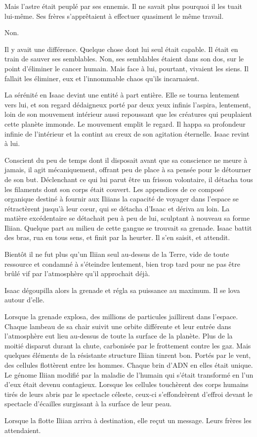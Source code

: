 \documentclass[12pt]{book}
\begin{document}
Mais l'astre était peuplé par ses ennemis. Il ne savait plus pourquoi il les tuait lui-même. Ses frères s'apprêtaient à effectuer quasiment le même travail.


Non.


Il y avait une différence. Quelque chose dont lui seul était capable. Il était en train de sauver ses semblables. Non, ses semblables étaient dans son dos, sur le point d'éliminer le cancer humain. Mais face à lui, pourtant, vivaient les siens. Il fallait les éliminer, eux et l'innommable chaos qu'ils incarnaient.


La sérénité en Isaac devint une entité à part entière. Elle se tourna lentement vers lui, et son regard dédaigneux porté par deux yeux infinis l'aspira, lentement, loin de son mouvement intérieur aussi repoussant que les créatures qui peuplaient cette planète immonde. Le mouvement emplit le regard. Il happa sa profondeur infinie de l'intérieur et la contint au creux de son agitation éternelle. Isaac revint à lui.


Conscient du peu de temps dont il disposait avant que sa conscience ne meure à jamais, il agit mécaniquement, offrant peu de place à sa pensée pour le détourner de son but. Déclenchant ce qui lui parut être un frisson volontaire, il détacha tous les filaments dont son corps était couvert. Les appendices de ce composé organique destiné à fournir aux Iliians la capacité de voyager dans l'espace se rétractèrent jusqu'à leur cœur, qui se détacha d'Isaac et dériva au loin. La matière excédentaire se détachait peu à peu de lui, sculptant à nouveau sa forme Iliian. Quelque part au milieu de cette gangue se trouvait sa grenade. Isaac battit des bras, rua en tous sens, et finit par la heurter. Il s'en saisit, et attendit.


Bientôt il ne fut plus qu'un Iliian seul au-dessus de la Terre, vide de toute ressource et condamné à s'éteindre lentement, bien trop tard pour ne pas être brûlé vif par l'atmosphère qu'il approchait déjà.


Isaac dégoupilla alors la grenade et régla sa puissance au maximum. Il se lova autour d'elle.


Lorsque la grenade explosa, des millions de particules jaillirent dans l'espace. Chaque lambeau de sa chair suivit une orbite différente et leur entrée dans l'atmosphère eut lieu au-dessus de toute la surface de la planète. Plus de la moitié disparut durant la chute, carbonisée par le frottement contre les gaz. Mais quelques éléments de la résistante structure Iliian tinrent bon. Portés par le vent, des cellules flottèrent entre les hommes. Chaque brin d'ADN en elles était unique. Le génome Iliian modifié par la maladie de l'humain qui s'était transformé en l'un d'eux était devenu contagieux. Lorsque les cellules touchèrent des corps humains tirés de leurs abris par le spectacle céleste, ceux-ci s'effondrèrent d'effroi devant le spectacle d'écailles surgissant à la surface de leur peau.


Lorsque la flotte Iliian arriva à destination, elle reçut un message. Leurs frères les attendaient.
\end{document}
